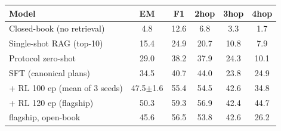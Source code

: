 \begin{tabular}{lccccc}
\toprule
Model & EM & F1 & 2hop & 3hop & 4hop \\
\midrule
Closed-book (no retrieval) & 4.8 & 12.6 & 6.8 & 3.3 & 1.7 \\
Single-shot RAG (top-10) & 15.4 & 24.9 & 20.7 & 10.8 & 7.9 \\
Protocol zero-shot & 29.0 & 38.2 & 37.9 & 24.3 & 10.1 \\
SFT (canonical plans) & 34.5 & 40.7 & 44.0 & 23.8 & 24.9 \\
+ RL 100 ep (mean of 3 seeds) & 47.5$\pm$1.6 & 55.4 & 54.5 & 42.6 & 34.8 \\
+ RL 120 ep (flagship) & 50.3 & 59.3 & 56.9 & 42.4 & 44.7 \\
flagship, open-book & 45.6 & 56.5 & 53.8 & 42.6 & 26.2 \\
\bottomrule
\end{tabular}
